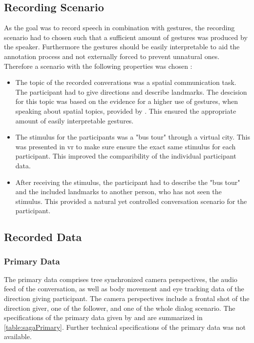 \documentclass[a4paper]{article}
\begin{document}
		\subsection{Recording Scenario}
			As the goal was to record speech in combination with gestures, the recording scenario had to chosen such that a sufficient amount of gestures was produced by the speaker. Furthermore the gestures should be easily interpretable to aid the annotation process and not externally forced to prevent unnatural ones. Therefore a scenario with the following properties was chosen \cite[ch. 2]{Bielefeld2010}:	
			\begin{itemize}
				\item The topic of the recorded converations was a spatial communication task. The participant had to give directions and describe landmarks. The descision for this topic was based on the evidence for a higher use of gestures, when speaking about spatial topics, provided by \cite[p. 313]{Alibali2005}. This ensured the appropriate amount of easily interpretable gestures.
				\item The stimulus for the participants was a "bus tour" through a virtual city. This was presented in \gls{vr} to make sure ensure the exact same stimulus for each participant. This improved the comparibility of the individual participant data.
				\item After receiving the stimulus, the participant had to describe the "bus tour" and the included landmarks to another person, who has not seen the stimulus. This provided a natural yet controlled conversation scenario for the participant.
			\end{itemize}	
						
		\subsection{Recorded Data}
			\subsubsection{Primary Data}
				The primary data comprises tree synchronized camera perspectives, the audio feed of the conversation, as well as body movement and eye tracking data of the direction giving participant. The camera perspectives include a frontal shot of the direction giver, one of the follower, and one of the whole dialog scenario. The specifications of the primary data given by \cite[ch. 2.1]{Bielefeld2010} and \cite{BAS2014} are summarized in \ref{table:sagaPrimary}. Further technical specifications of the primary data was not available.
				
\end{document}
